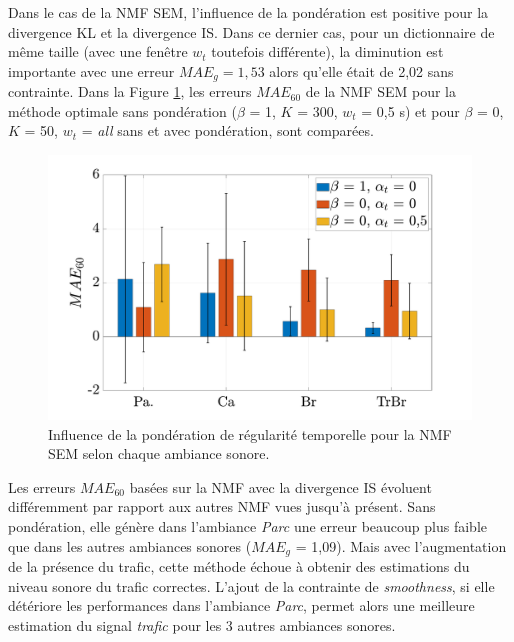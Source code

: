 Dans le cas de la NMF SEM, l'influence de la pondération est positive pour la divergence KL et la divergence IS. Dans ce dernier cas, pour un dictionnaire de même taille (avec une fenêtre $w_t$ toutefois différente), la diminution est importante avec une erreur $MAE_g = 1,53$ alors qu'elle était de 2,02 sans contrainte. 
Dans la Figure \ref{fig:smoothMAE60}, les erreurs $MAE_{60}$ de la NMF SEM pour la méthode optimale sans pondération ($\beta$ = 1, $K$ = 300, $w_t$ = 0,5 s) et pour $\beta$ = 0, $K$ = 50, $w_t$ = \textit{all} sans et avec pondération, sont comparées. 

\begin{figure}[h!]
\centering
\includegraphics[width=.9\linewidth]{./figures/resultats/grafic_smooth_bar.pdf}
\caption{Influence de la pondération de régularité temporelle pour la NMF SEM selon chaque ambiance sonore.}
\label{fig:smoothMAE60}
\end{figure}


Les erreurs $MAE_{60}$ basées sur la NMF avec la divergence IS évoluent différemment par rapport aux autres NMF vues jusqu'à présent. Sans pondération, elle génère dans l'ambiance \textit{Parc} une erreur beaucoup plus faible que dans les autres ambiances sonores ($MAE_g$ = 1,09). Mais avec l'augmentation de la présence du trafic, cette méthode échoue à obtenir des estimations du niveau sonore du trafic correctes. L'ajout de la contrainte de \textit{smoothness}, si elle détériore les performances dans l'ambiance \textit{Parc}, permet alors une meilleure estimation du signal \textit{trafic} pour les 3 autres ambiances sonores.

